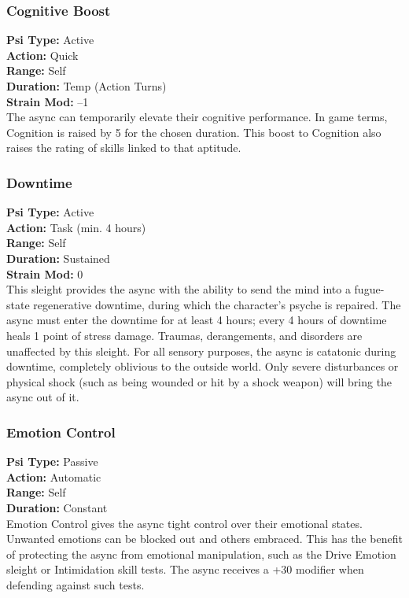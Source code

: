 \subsubsection{Cognitive Boost} \textbf{Psi Type:} Active \\ \textbf{Action:} Quick \\ \textbf{Range:} Self \\ \textbf{Duration:} Temp (Action Turns) \\ \textbf{Strain Mod:} –1 \\ The async can temporarily elevate their cognitive performance. In game terms, Cognition is raised by 5 for the chosen duration. This boost to Cognition also raises the rating of skills linked to that aptitude. 

\subsubsection{Downtime} \textbf{Psi Type:} Active \\ \textbf{Action:} Task (min. 4 hours) \\ \textbf{Range:} Self \\ \textbf{Duration:} Sustained \\ \textbf{Strain Mod:} 0 \\ This sleight provides the async with the ability to send the mind into a fugue-state regenerative downtime, during which the character’s psyche is repaired. The async must enter the downtime for at least 4 hours; every 4 hours of downtime heals 1 point of stress damage. Traumas, derangements, and disorders are unaffected by this sleight. For all sensory purposes, the async is catatonic during downtime, completely oblivious to the outside world. Only severe disturbances or physical shock (such as being wounded or hit by a shock weapon) will bring the async out of it. 

\subsubsection{Emotion Control} \textbf{Psi Type:} Passive \\ \textbf{Action:} Automatic \\ \textbf{Range:} Self \\ \textbf{Duration:} Constant \\ Emotion Control gives the async tight control over their emotional states. Unwanted emotions can be blocked out and others embraced. This has the benefit of protecting the async from emotional manipulation, such as the Drive Emotion sleight or Intimidation skill tests. The async receives a +30 modifier when defending against such tests. 

